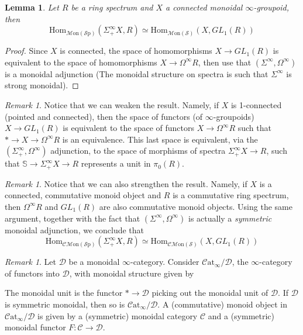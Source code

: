 \documentclass[a4paper]{book}
\newcommand{\lA}{\mathcal{A}}
\newcommand{\lB}{\mathcal{B}}
\newcommand{\lC}{\mathcal{C}}
\newcommand{\lD}{\mathcal{D}}
\newcommand{\lM}{\mathcal{M}}
\newcommand{\lS}{\mathcal{S}}
\newcommand{\bS}{\mathbb{S}}
\newcommand{\cat}{\lC\mathrm{at}} %
\newcommand{\Sp}{\lS\mathrm{p}} %
\renewcommand{\hom}{\mathrm{Hom}} %
\newcommand{\Mon}{\lM\mathrm{on}} %
\newcommand{\CMon}{\lC\Mon} %
\newtheorem{lemma}[equation]{Lemma}
\theoremstyle{definition}
\theoremstyle{remark}
\newtheorem{remark}[equation]{Remark}
\numberwithin{equation}{section}
\begin{document}
\begin{lemma}\label{lem:adj}
	Let $R$ be a ring spectrum and $X$ a connected monoidal $\infty$-groupoid, then \[\hom_{\Mon(\Sp)}(\Sigma^{\infty}_+X,R)\simeq\hom_{\Mon(\lS)}(X,GL_1(R))\] 
\end{lemma}
\begin{proof}
	Since $X$ is connected, the space of homomorphisms $X\to GL_1(R)$ is equivalent to the space of homomorphisms $X\to\Omega^\infty R$, then use that $(\Sigma^\infty,\Omega^\infty)$ is a monoidal adjunction (The monoidal structure on spectra is such that $\Sigma^\infty$ is strong monoidal). 
\end{proof}
\begin{remark}
	Notice that we can weaken the result. Namely, if $X$ is 1-connected (pointed and connected), then the space of functors (of $\infty$-groupoids) $X\to GL_1(R)$ is equivalent to the space of functors $X\to\Omega^\infty R$ such that $*\to X\to\Omega^\infty R$ is an equivalence. This last space is equivalent, via the $(\Sigma^\infty_+,\Omega^\infty)$ adjunction, to the space of morphisms of spectra $\Sigma^\infty_+X\to R$, such that $\bS\to\Sigma^\infty_+X\to R$ represents a unit in $\pi_0(R)$.
\end{remark}
\begin{remark}\label{rmk:strengthen}
	Notice that we can also strengthen the result. Namely, if $X$ is a connected, commutative monoid object and $R$ is a commutative ring spectrum, then $\Omega^\infty R$ and $GL_1(R)$ are also commutative monoid objects. Using the same argument, together with the fact that $(\Sigma^\infty,\Omega^\infty)$ is actually a \emph{symmetric} monoidal adjunction, we conclude that \[\hom_{\CMon(\Sp)}(\Sigma^\infty_+X,R)\simeq\hom_{\CMon(\lS)}(X,GL_1(R))\] 
\end{remark}
\begin{remark}\label{rmk:moncat}
	Let $\lD$ be a monoidal $\infty$-category. Consider $\cat_\infty/\lD$, the $\infty$-category of functors into $\lD$, with monoidal structure given by \begin{center}
	\end{center} The monoidal unit is the functor $*\to\lD$ picking out the monoidal unit of $\lD$. If $\lD$ is symmetric monoidal, then so is $\cat_\infty/\lD$. A (commutative) monoid object in $\cat_\infty/\lD$ is given by a (symmetric) monoidal category $\lC$ and a (symmetric) monoidal functor $F:\lC\to\lD$. 
\end{remark}
\end{document}
